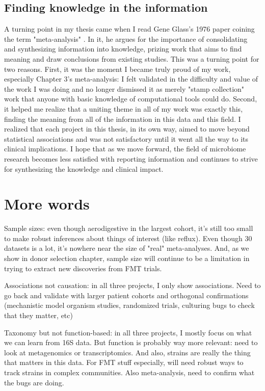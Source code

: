 \subsection{Finding knowledge in the information}

A turning point in my thesis came when I read Gene Glass's 1976 paper coining the term "meta-analysis" \cite{glass-1976}.
In it, he argues for the importance of consolidating and synthesizing information into knowledge, prizing work that aims to find meaning and draw conclusions from existing studies.
This was a turning point for two reasons.
First, it was the moment I became truly proud of my work, especially Chapter 3's meta-analysis: I felt validated in the difficulty and value of the work I was doing and no longer dismissed it as merely "stamp collection" work that anyone with basic knowledge of computational tools could do.
Second, it helped me realize that a uniting theme in all of my work was exactly this, finding the meaning from all of the information in this data and this field.
I realized that each project in this thesis, in its own way, aimed to move beyond statistical associations and was not satisfactory until it went all the way to its clinical implications.
I hope that as we move forward, the field of microbiome research becomes less satisfied with reporting information and continues to strive for synthesizing the knowledge and clinical impact.


\section{More words}

Sample sizes: even though aerodigestive in the largest cohort, it's still too small to make robust inferences about things of interest (like reflux). Even though 30 datasets is a lot, it's nowhere near the size of "real" meta-analyses. And, as we show in donor selection chapter, sample size will continue to be a limitation in trying to extract new discoveries from FMT trials.

Associations not causation: in all three projects, I only show associations. Need to go back and validate with larger patient cohorts and orthogonal confirmations (mechanistic model organism studies, randomized trials, culturing bugs to check that they matter, etc)

Taxonomy but not function-based: in all three projects, I mostly focus on what we can learn from 16S data. But function is probably way more relevant: need to look at metagenomics or transcriptomics. And also, strains are really the thing that matters in this data. For FMT stuff especially, will need robust ways to track strains in complex communities. Also meta-analysis, need to confirm what the bugs are doing.


